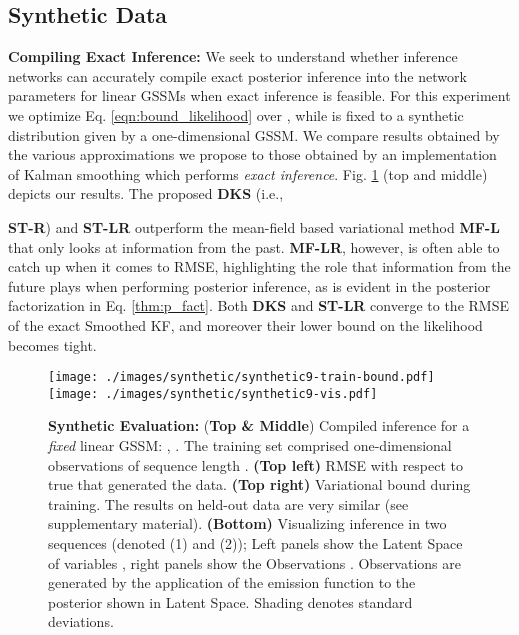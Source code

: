 \documentclass[letterpaper]{article}
\theoremstyle{plain}
\newcommand{\citep}{\cite}
\newcommand{\DKS}{\textbf{DKS}\xspace}
\begin{document}
\subsection{Synthetic Data}
\textbf{Compiling Exact Inference: }
We seek to understand whether inference networks can accurately 
compile exact posterior inference into the network parameters 
for linear GSSMs when exact inference is feasible.
For this experiment we optimize Eq. \ref{eqn:bound_likelihood} over
, while  is fixed to a synthetic distribution given by a
one-dimensional GSSM. 
We compare results obtained by the various approximations we propose 
to those obtained by an implementation of Kalman smoothing \citep{kfimplementation} which performs \emph{exact inference}. 
Fig. \ref{fig:synthetic_linear} (top and middle) depicts our results. 
The proposed \textbf{\DKS} (i.e., {\textbf{ST-R}) and \textbf{ST-LR}
outperform the mean-field based variational method \textbf{MF-L} that
only looks at information from the past. \textbf{MF-LR}, however, is
often able to catch up when it comes to RMSE,
highlighting the role that information from the 
future plays when performing posterior 
inference, as is evident in the posterior factorization in Eq. \ref{thm:p_fact}. 
Both \textbf{\DKS} and \textbf{ST-LR} converge to the RMSE of the
exact Smoothed KF, and moreover their lower bound on the likelihood becomes tight.



\begin{figure}[t!]
	\begin{center}
		\texttt{[image: ./images/synthetic/synthetic9-train-bound.pdf]}
		\texttt{[image: ./images/synthetic/synthetic9-vis.pdf]}
	\end{center}
\caption{\label{fig:synthetic_linear}
\small \textbf{Synthetic Evaluation: } ({\bf Top \& Middle}) Compiled inference for a \emph{fixed} linear
  GSSM: , .
The training set comprised  one-dimensional 
observations of sequence length .
{\bf (Top left)} RMSE with respect to true 
  that generated the data. 
{\bf (Top right)} Variational bound during
  training. The results on held-out data are very similar (see supplementary material).
{\bf (Bottom)} Visualizing inference in two sequences (denoted (1) and (2)); Left panels show the Latent Space of variables , right panels show the Observations . Observations are generated by the application of the 
emission function to the posterior shown in Latent Space.
Shading denotes standard deviations.
}
\end{figure}

}
\end{document}
